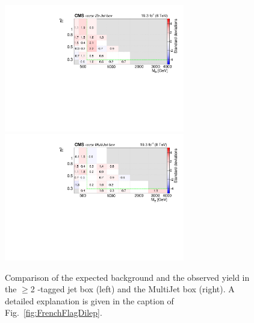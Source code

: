 \begin{figure}[tb!]
\centering
\includegraphics[width=0.7\textwidth]{figs/analysis8TeV/nSigmaLog_Jet2b.pdf}
\includegraphics[width=0.7\textwidth]{figs/analysis8TeV/nSigmaLog_MultiJetFITS.pdf}
\caption{Comparison of the expected background and the observed yield
  in the $\geq$2 \PQb-tagged jet box (left) and the MultiJet box
  (right). A detailed explanation is given in the caption of
  Fig.~\ref{fig:FrenchFlagDilep}.\label{fig:FrenchFlagHad}}

\end{figure}

